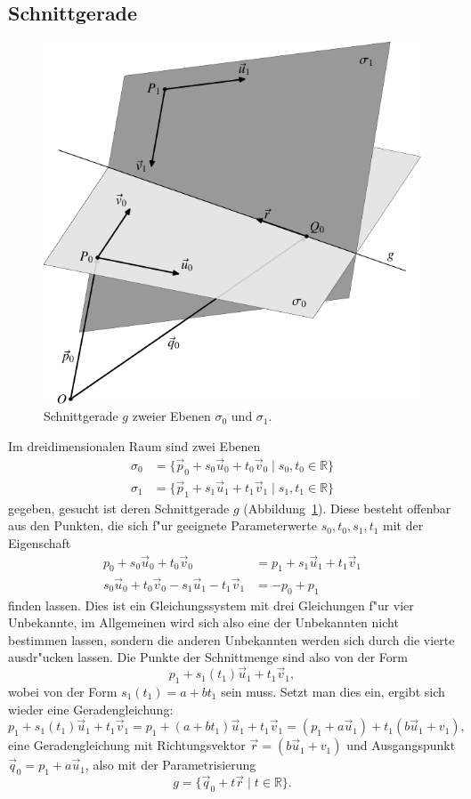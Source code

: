 \subsection{Schnittgerade}
\begin{figure}
\begin{center}
\includegraphics{images/v-10}
\end{center}
\caption{Schnittgerade $g$ zweier Ebenen $\sigma_0$ und $\sigma_1$.
\label{image-schnittgerade}}
\end{figure}
Im dreidimensionalen Raum sind zwei Ebenen
\begin{align*}
\sigma_0&=
\{\vec p_0+s_0\vec u_0+t_0\vec v_0\;|\;s_0, t_0\in\mathbb R\}
\\
\sigma_1&=
\{\vec p_1+s_1\vec u_1+t_1\vec v_1\;|\;s_1, t_1\in\mathbb R\}
\end{align*}
gegeben, gesucht ist deren Schnittgerade $g$
(Abbildung~\ref{image-schnittgerade}).
Diese besteht offenbar aus den Punkten, die sich f"ur geeignete Parameterwerte
$s_0,t_0,s_1,t_1$ mit der Eigenschaft
\begin{align*}
p_0+s_0\vec u_0+t_0\vec v_0
&=
p_1+s_1\vec u_1+t_1\vec v_1
\\
s_0\vec u_0+t_0\vec v_0
-s_1\vec u_1-t_1\vec v_1
&=
-p_0+
p_1
\end{align*}
finden lassen.
Dies ist ein Gleichungssystem mit drei Gleichungen f"ur
vier Unbekannte, im Allgemeinen wird sich also eine der Unbekannten
nicht bestimmen lassen, sondern die anderen Unbekannten werden sich
durch die vierte ausdr"ucken lassen.
Die Punkte der Schnittmenge sind also von der Form
\[
p_1+s_1(t_1)\vec u_1+t_1\vec v_1,
\]
wobei von der Form $s_1(t_1)=a+bt_1$ sein muss.
Setzt man dies ein, ergibt sich wieder eine Geradengleichung:
\[
p_1+s_1(t_1)\vec u_1+t_1\vec v_1
=
p_1+(a+bt_1)\vec u_1+t_1\vec v_1
=
(p_1+a\vec u_1)+t_1(b\vec u_1+v_1),
\]
eine Geradengleichung mit Richtungsvektor $\vec r = (b\vec u_1+v_1)$ und
Ausgangspunkt $\vec q_0=p_1+a\vec u_1$, also mit der Parametrisierung
\[
g=\{\vec q_0+t\vec r\;|\;t\in\mathbb R\}.
\]

